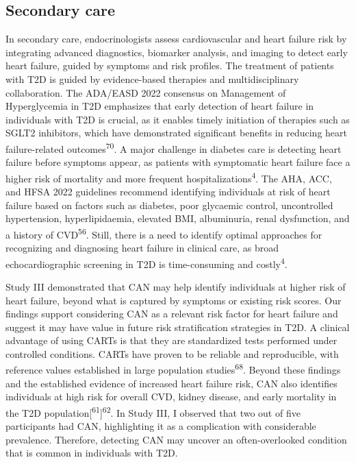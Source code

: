 \documentclass[
  letterpaper,
  headsepline=true,
  open=any]{scrbook}
\begin{document}
\hypertarget{secondary-care}{%
\subsection{Secondary care}\label{secondary-care}}

In secondary care, endocrinologists assess cardiovascular and heart
failure risk by integrating advanced diagnostics, biomarker analysis,
and imaging to detect early heart failure, guided by symptoms and risk
profiles. The treatment of patients with T2D is guided by evidence-based
therapies and multidisciplinary collaboration. The ADA/EASD 2022
consensus on Management of Hyperglycemia in T2D emphasizes that early
detection of heart failure in individuals with T2D is crucial, as it
enables timely initiation of therapies such as SGLT2 inhibitors, which
have demonstrated significant benefits in reducing heart failure-related
outcomes\textsuperscript{70}. A major challenge in diabetes care is
detecting heart failure before symptoms appear, as patients with
symptomatic heart failure face a higher risk of mortality and more
frequent hospitalizations\textsuperscript{4}. The AHA, ACC, and HFSA
2022 guidelines recommend identifying individuals at risk of heart
failure based on factors such as diabetes, poor glycaemic control,
uncontrolled hypertension, hyperlipidaemia, elevated BMI, albuminuria,
renal dysfunction, and a history of CVD\textsuperscript{56}. Still,
there is a need to identify optimal approaches for recognizing and
diagnosing heart failure in clinical care, as broad echocardiographic
screening in T2D is time-consuming and costly\textsuperscript{4}.

Study III demonstrated that CAN may help identify individuals at higher
risk of heart failure, beyond what is captured by symptoms or existing
risk scores. Our findings support considering CAN as a relevant risk
factor for heart failure and suggest it may have value in future risk
stratification strategies in T2D. A clinical advantage of using CARTs is
that they are standardized tests performed under controlled conditions.
CARTs have proven to be reliable and reproducible, with reference values
established in large population studies\textsuperscript{68}. Beyond
these findings and the established evidence of increased heart failure
risk, CAN also identifies individuals at high risk for overall CVD,
kidney disease, and early mortality in the T2D
population{[}\textsuperscript{61}{]}\textsuperscript{62}. In Study III,
I observed that two out of five participants had CAN, highlighting it as
a complication with considerable prevalence. Therefore, detecting CAN
may uncover an often-overlooked condition that is common in individuals
with T2D.
\end{document}
